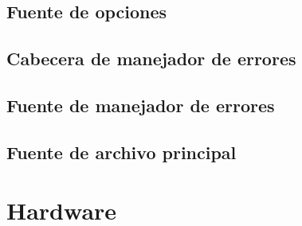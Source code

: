 \subsection{Fuente de opciones}


\subsection{Cabecera de manejador de errores}


\subsection{Fuente de manejador de errores}\label{cap:errors}


\subsection{Fuente de archivo principal}


\newpage
\section{Hardware}
